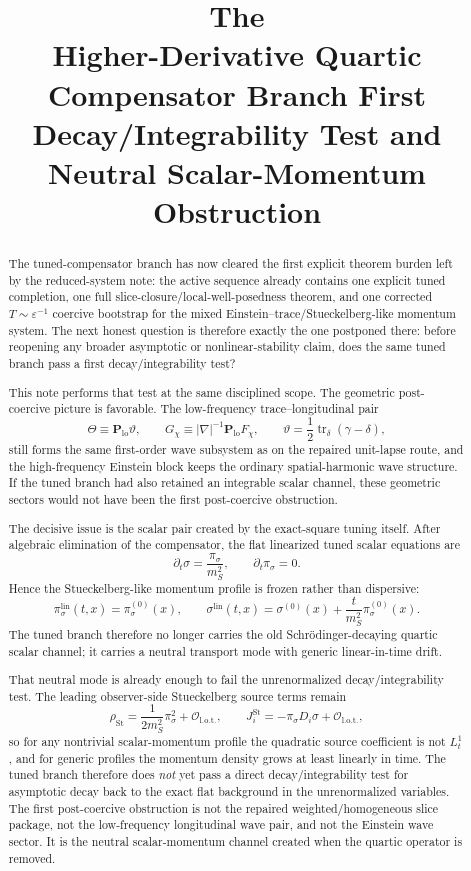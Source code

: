 \documentclass[11pt]{article}
\title{\textbf{The \TheoryName{}}\\[0.4em]
\large Higher-Derivative Quartic Compensator Branch First Decay/Integrability Test and Neutral Scalar-Momentum Obstruction}
\author{}
\date{}
\begin{document}
\maketitle

\begin{abstract}
The tuned-compensator branch has now cleared the first explicit theorem burden left by the reduced-system note: the active sequence already contains one explicit tuned completion, one full slice-closure/local-well-posedness theorem, and one corrected \(T\sim\varepsilon^{-1}\) coercive bootstrap for the mixed Einstein--trace/Stueckelberg-like momentum system. The next honest question is therefore exactly the one postponed there: before reopening any broader asymptotic or nonlinear-stability claim, does the same tuned branch pass a first decay/integrability test?

This note performs that test at the same disciplined scope. The geometric post-coercive picture is favorable. The low-frequency trace--longitudinal pair
\[
\Theta\equiv \mathbf P_{\mathrm{lo}}\vartheta,
\qquad
G_\chi\equiv |\nabla|^{-1}\mathbf P_{\mathrm{lo}}F_\chi,
\qquad
\vartheta=\frac12\operatorname{tr}_\delta(\gamma-\delta),
\]
still forms the same first-order wave subsystem as on the repaired unit-lapse route, and the high-frequency Einstein block keeps the ordinary spatial-harmonic wave structure. If the tuned branch had also retained an integrable scalar channel, these geometric sectors would not have been the first post-coercive obstruction.

The decisive issue is the scalar pair created by the exact-square tuning itself. After algebraic elimination of the compensator, the flat linearized tuned scalar equations are
\[
\partial_t \sigma = \frac{\pi_\sigma}{m_S^2},
\qquad
\partial_t\pi_\sigma = 0.
\]
Hence the Stueckelberg-like momentum profile is frozen rather than dispersive:
\[
\pi_\sigma^{\mathrm{lin}}(t,x)=\pi_\sigma^{(0)}(x),
\qquad
\sigma^{\mathrm{lin}}(t,x)
=
\sigma^{(0)}(x)
+\frac{t}{m_S^2}\pi_\sigma^{(0)}(x).
\]
The tuned branch therefore no longer carries the old Schr\"odinger-decaying quartic scalar channel; it carries a neutral transport mode with generic linear-in-time drift.

That neutral mode is already enough to fail the unrenormalized decay/integrability test. The leading observer-side Stueckelberg source terms remain
\[
\rho_{\mathrm{St}}
=
\frac{1}{2m_S^2}\pi_\sigma^2+\mathcal O_{\mathrm{l.o.t.}},
\qquad
J_i^{\mathrm{St}}
=
-\pi_\sigma D_i\sigma+\mathcal O_{\mathrm{l.o.t.}},
\]
so for any nontrivial scalar-momentum profile the quadratic source coefficient is not \(L_t^1\), and for generic profiles the momentum density grows at least linearly in time. The tuned branch therefore does \emph{not} yet pass a direct decay/integrability test for asymptotic decay back to the exact flat background in the unrenormalized variables. The first post-coercive obstruction is not the repaired weighted/homogeneous slice package, not the low-frequency longitudinal wave pair, and not the Einstein wave sector. It is the neutral scalar-momentum channel created when the quartic operator is removed.


\end{abstract}
\end{document}
